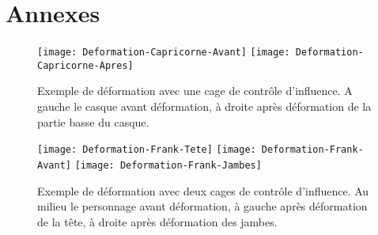 
\chapter{Annexes}

\graphicspath{{Appendix1/Appendix1Figs/PNG/}{Appendix1/Appendix1Figs/PDF/}{Appendix1/Appendix1Figs/}}

\begin{figure}[ht]
  \begin{center}
    \texttt{[image: Deformation-Capricorne-Avant]}
    \texttt{[image: Deformation-Capricorne-Apres]}

    \caption[Exemple de déformation cage de contrôle d'influence] {Exemple de
déformation avec une cage de contrôle d'influence. A gauche le casque avant
déformation, à droite après déformation de la partie basse du casque.}

  \end{center}
\end{figure}

\begin{figure}[ht]
  \begin{center}
    \texttt{[image: Deformation-Frank-Tete]}
    \texttt{[image: Deformation-Frank-Avant]}
    \texttt{[image: Deformation-Frank-Jambes]}

    \caption[Exemple de déformation multi-cage] {Exemple de déformation avec
deux cages de contrôle d'influence. Au milieu le personnage avant déformation,
à gauche après déformation de la tête, à droite après déformation des jambes.}

  \end{center}
\end{figure}

